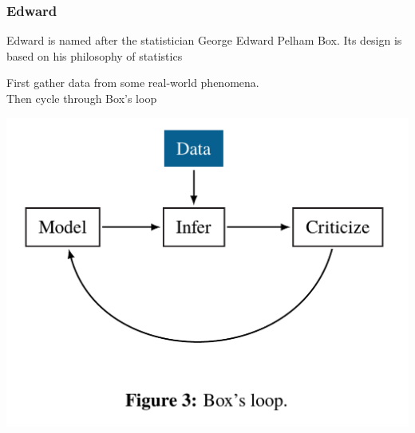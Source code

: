 \documentclass[table,dvipsnames]{beamer}
\newcommand{\highlt}{\textcolor{NavyBlue}}
\begin{document}
\begin{frame}[fragile]
\frametitle{Edward}
\footnotesize
\begin{block}{}
 Edward is named after the statistician \highlt{George Edward Pelham Box}. Its design is based on his philosophy of statistics
\end{block}
First gather data from some real-world phenomena. \ \\ 
Then cycle through \highlt{Box’s loop}
\begin{center}
\includegraphics[scale=0.35]{boxs-loop.png}
\end{center}
\citep{Tran16}
\end{frame}
\end{document}
